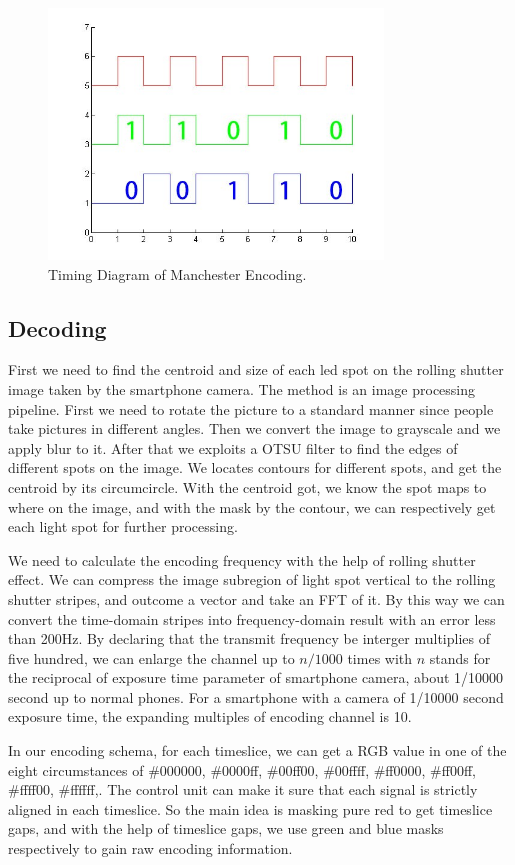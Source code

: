 \documentclass[conference]{IEEEtran}
\begin{document}
	\begin{figure}
		\centering
		\includegraphics[width=3.5in]{../img.origin/fig3.jpg}
		\caption{Timing Diagram of Manchester Encoding.}
		\label{fig_3}
	\end{figure}

\subsection{Decoding}
First we need to find the centroid and size of each led spot on the rolling shutter image taken by the smartphone camera. The method is an image processing pipeline. First we need to rotate the picture to a standard manner since people take pictures in different angles. Then we convert the image to grayscale and we apply blur to it. After that we exploits a OTSU filter to find the edges of different spots on the image. We locates contours for different spots, and get the centroid by its circumcircle. With the centroid got, we know the spot maps to where on the image, and with the mask by the contour, we can respectively get each light spot for further processing. 

We need to calculate the encoding frequency with the help of rolling shutter effect. We can compress the image subregion of light spot vertical to the rolling shutter stripes, and outcome a vector and take an FFT of it. By this way we can convert the time-domain stripes into frequency-domain result with an error less than 200Hz. By declaring that the transmit frequency be interger multiplies of five hundred, we can enlarge the channel up to $n/1000$ times with $n$ stands for the reciprocal of exposure time parameter of smartphone camera, about 1/10000 second up to normal phones. For a smartphone with a camera of 1/10000 second exposure time, the expanding multiples of encoding channel is 10.  

In our encoding schema, for each timeslice, we can get a RGB value in one of the eight circumstances of {\#000000, \#0000ff, \#00ff00, \#00ffff, \#ff0000, \#ff00ff, \#ffff00, \#ffffff,}. The control unit can make it sure that each signal is strictly aligned in each timeslice. So the main idea is masking pure red to get timeslice gaps, and with the help of timeslice gaps, we use green and blue masks respectively to gain raw encoding information. 
\end{document}
